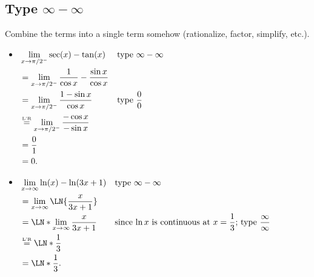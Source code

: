 \subsection*{Type $ \infty-\infty$}
Combine the terms into a single term somehow (rationalize, factor, simplify, etc.).
\begin{Example}{}{}
    \begin{itemize}
        \item $ \begin{aligned}[t]
                       & \lim\limits_{{x} \to {\pi/2^-}}\sec(x)-\tan(x)                         &  & \text{type }\infty-\infty \\
                       & =\lim\limits_{{x} \to {\pi/2^-}}\frac{1}{\cos x}-\frac{\sin x}{\cos x}                                \\
                       & =\lim\limits_{{x} \to {\pi/2^-}}\frac{1-\sin x}{\cos x}                &  & \text{type }\frac{0}{0}   \\
                       & \stackrel{\text{\tiny L'R}}{=} \lim\limits_{{x} \to {\pi/2^-}}\frac{-\cos x}{-\sin x}                                           \\
                       & =\frac{0}{1}                                                                                          \\
                       & =0.
                  \end{aligned} $
        \item $\begin{aligned}[t]
                       & \lim\limits_{{x} \to {\infty}}\ln(x)-\ln(3x+1)      &  & \text{type }\infty-\infty                                                         \\
                       & =\lim\limits_{{x} \to {\infty}}\LN{\frac{x}{3x+1}}                                                                                         \\
                       & =\LN*{\lim\limits_{{x} \to {\infty}}\frac{x}{3x+1}} &  & \text{since $\ln x$ is continuous at $x=\frac{1}{3}$; type }\frac{\infty}{\infty} \\
                       & \LHR\LN*{\frac{1}{3}}                                                                                                                      \\
                       & =\LN*{\frac{1}{3}}.
                  \end{aligned}$
    \end{itemize}
\end{Example}
